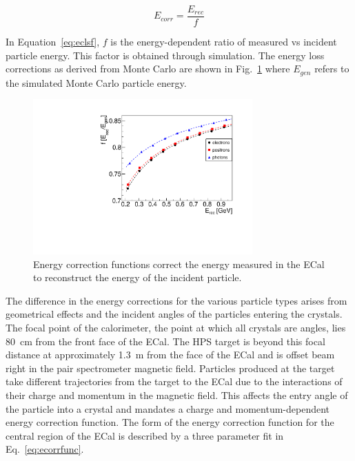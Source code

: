 \begin{equation}
\label{eq:eclsf}
E_{corr} = \dfrac{E_{rec}}{f}   
\end{equation}

In Equation~\eqref{eq:eclsf}, $f$ is the energy-dependent ratio of measured vs incident particle energy. This factor is obtained through simulation. The energy loss corrections as derived from Monte Carlo are shown in Fig.~\ref{Figure:ecorr} where $E_{gen}$ refers to the simulated Monte Carlo particle energy.

\begin{figure}[thb]
  \centering
      \includegraphics[width=0.75\textwidth]{pics/performance/energycorrection.pdf}
  \caption[ECal energy shower correction functions from simulation]{Energy correction functions correct the energy measured in the ECal to reconstruct the energy of the incident particle.}
  \label{Figure:ecorr}
\end{figure}

The difference in the energy corrections for the various particle types arises from geometrical effects and the incident angles of the particles entering the crystals.~\cite{Garcon} The focal point of the calorimeter, the point at which all crystals are angles, lies 80~cm from the front face of the ECal. The HPS target is beyond this focal distance at approximately 1.3~m from the face of the ECal and is offset beam right in the pair spectrometer magnetic field. Particles produced at the target take different trajectories from the target to the ECal due to the interactions of their charge and momentum in the magnetic field. This affects the entry angle of the particle into a crystal and mandates a charge and momentum-dependent energy correction function. The form of the energy correction function for the central region of the ECal is described by a three parameter fit in Eq.~\eqref{eq:ecorrfunc}.

